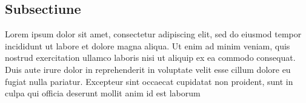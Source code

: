 \subsection{Subsectiune}
\label{subsec:ch3sec2subsec1}

\par Lorem ipsum dolor sit amet, consectetur adipiscing elit, sed do eiusmod tempor
incididunt ut labore et dolore magna aliqua. Ut enim ad minim veniam, quis nostrud
exercitation ullamco laboris nisi ut aliquip ex ea commodo consequat. Duis aute irure
dolor in reprehenderit in voluptate velit esse cillum dolore eu fugiat nulla pariatur.
Excepteur sint occaecat cupidatat non proident, sunt in culpa qui officia deserunt mollit
anim id est laborum
